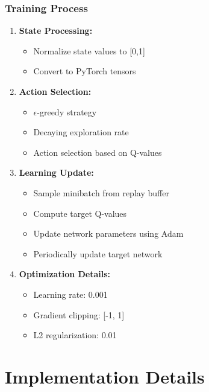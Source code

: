 \documentclass[a4paper, 12pt]{article}
\begin{document}
\subsubsection{Training Process}
\begin{tcolorbox}[title=DQN Training Workflow]
\begin{enumerate}
    \item \textbf{State Processing:}
    \begin{itemize}
        \item Normalize state values to [0,1]
        \item Convert to PyTorch tensors
    \end{itemize}

    \item \textbf{Action Selection:}
    \begin{itemize}
        \item $\epsilon$-greedy strategy
        \item Decaying exploration rate
        \item Action selection based on Q-values
    \end{itemize}

    \item \textbf{Learning Update:}
    \begin{itemize}
        \item Sample minibatch from replay buffer
        \item Compute target Q-values
        \item Update network parameters using Adam
        \item Periodically update target network
    \end{itemize}

    \item \textbf{Optimization Details:}
    \begin{itemize}
        \item Learning rate: 0.001
        \item Gradient clipping: [-1, 1]
        \item L2 regularization: 0.01
    \end{itemize}
\end{enumerate}
\end{tcolorbox}

\section{Implementation Details}
\end{document}
